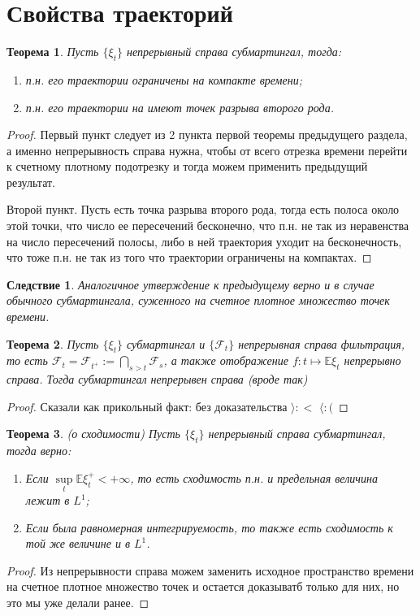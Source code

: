\documentclass[12pt,a4paper]{article} %
\newtheorem{theorem}{Теорема}
\newtheorem{consequence}{Следствие}
\newcommand{\E}{\mathbb{E}}
\newcommand{\F}{\mathcal{F}}
\begin{document}
	\section{Свойства траекторий}
	\begin{theorem}
		Пусть $\{\xi_t\}$ непрерывный справа субмартингал, тогда:
		\begin{enumerate}
			\item п.н. его траектории ограничены на компакте времени;
			\item п.н. его траектории на имеют точек разрыва второго рода.
		\end{enumerate}
	\end{theorem}
	\begin{proof}
		Первый пункт следует из 2 пункта первой теоремы предыдущего раздела, а именно непрерывность справа нужна, чтобы от всего отрезка времени перейти к счетному плотному подотрезку и тогда можем применить предыдущий результат.
		
		Второй пункт. Пусть есть точка разрыва второго рода, тогда есть полоса около этой точки, что число ее пересечений бесконечно, что п.н. не так из неравенства на число пересечений полосы, либо в ней траектория уходит на бесконечность, что тоже п.н. не так из того что траектории ограничены на компактах.
	\end{proof}
	\begin{consequence}
		Аналогичное утверждение к предыдущему верно и в случае обычного субмартингала, суженного на счетное плотное множество точек времени.
	\end{consequence}
	\begin{theorem}
		Пусть $\{\xi_t\}$ субмартингал и $\{\F_t\}$ непрерывная справа фильтрация, то есть $\F_t=\F_{t^{+}}:=\bigcap\limits_{s>t}\F_s$, а также отображение $f:t\mapsto\E\xi_t$ непрерывно справа. Тогда субмартингал непрерывен справа (вроде так)
	\end{theorem}
	\begin{proof}
		Сказали как прикольный факт: без доказательства $\rangle:<\,\, \langle:($
	\end{proof}
	\begin{theorem}
		(о сходимости) Пусть $\{\xi_t\}$ непрерывный справа субмартингал, тогда верно:
		\begin{enumerate}
			\item Если $\sup\limits_t\E\xi_t^{+}<+\infty$, то есть сходимость п.н. и предельная величина лежит в $L^1$;
			\item Если была равномерная интегрируемость, то также есть сходимость к той же величине и в $L^1$.
		\end{enumerate}
	\end{theorem}
	\begin{proof}
		Из непрерывности справа можем заменить исходное пространство времени на счетное плотное множество точек и остается доказыватб только для них, но это мы уже делали ранее.
	\end{proof}
\end{document}
